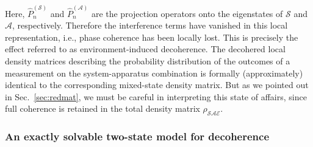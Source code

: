 \documentclass[twocolumn,rmp,aps,amsmath,amsfonts,noshowkeys,noshowpacs]{revtex4}
\begin{document}
%
Here, $\widehat{P}^{(\mathcal{S})}_n$ and
$\widehat{P}^{(\mathcal{A})}_n$ are the projection operators onto the
eigenstates of $\mathcal{S}$ and $\mathcal{A}$, respectively.
Therefore the interference terms have vanished in this local
representation, i.e., phase coherence has been locally lost. This is
precisely the effect referred to as environment-induced decoherence.
The decohered local density matrices describing the probability
distribution of the outcomes of a measurement on the system-apparatus
combination is formally (approximately) identical to the corresponding
mixed-state density matrix. But as we pointed out in
Sec.~\ref{sec:redmat}, we must be careful in interpreting this state
of affairs, since full coherence is retained in the total density
matrix $\rho_{\mathcal{SAE}}$.


\subsubsection{\label{sec:zurekmodel}An exactly solvable two-state model for decoherence}
\end{document}
